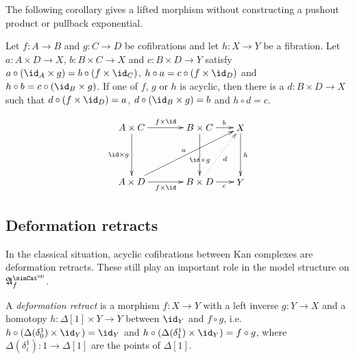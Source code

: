 \documentclass{tac}
\newcommand\hide[1]{}
\newcommand\dual{^{\mathrm{op}}}
\newcommand\s{^{\simCat\dual}}
\newcommand\of{:}
\newcommand\simplex\Delta
\newcommand\f{_f}
\newcommand\ambient{\mathfrak A}
\begin{document}
The following corollary gives a lifted morphism without constructing a pushout product or pullback exponential.

\begin{corollary} Let $f\of A\to B$ and $g\of C\to D$ be cofibrations and let $h\of X\to Y$ be a fibration. Let $a\of A\times D\to X$, $b\of B\times C\to X$ and $c\of B \times D\to Y$ satisfy $a\circ(\id_A\times g) = b\circ(f\times \id_C)$, $h\circ a=c\circ(f\times \id_D)$ and $h\circ b=c\circ(\id_B\times g)$. If one of $f$, $g$ or $h$ is acyclic, then there is a $d\of B\times D\to X$ such that $d\circ(f\times\id_D)=a$, $d\circ(\id_B\times g)=b$ and $h\circ d = c$.
\hide{\[\xymatrix{
A\times C\ar[r]^{f\times \id}\ar[d]_{\id\times g} & B\times C\ar[r]^b\ar[d]_(.3){\id\times g} & X\ar[d]^h\\
A\times D\ar[r]_{f\times \id} \ar[urr]^(.3){a} & B\times D \ar[r]_c \ar@{.>}[ur]_{d} & Y
}\]}
\[\xy
(0,20)*+{A\times C}="AC",(25,20)*+{B\times C}="BC",(40,20)*+{X}="X",
(0,0)*+{A\times D}="AD",(25,0)*+{B\times D}="BD",(40,0)*+{Y}="Y"
\ar^{f\times\id} "AC";"BC"
\ar_{\id\times g} "AC";"AD"
\ar_{f\times\id} "AD";"BD"
\ar^{a} "AD";"X"
\ar|(.6){\id\times g} "BC";"BD"
\ar^(.6){b} "BC";"X"
\ar@{.>}_{d} "BD";"X"
\ar_(.6){c} "BD";"Y"
\ar^{h} "X";"Y"
\endxy\]

\hide{Transposed view:
\[\xymatrix{
A\ar[r]^{a^t}\ar[d]_f & X^D\ar[r]^{X^g}\ar[d]^(.7){h^D} & X^C\ar[d]^{h^C}\\
B\ar[r]_{c^t} \ar[urr]_(.7){b^t} \ar@{.>}[ur]^{d^t} & Y^D \ar[r]_{Y^g} & Y^C
}\]}\label{triple lift}
\end{corollary}


\subsection{Deformation retracts}
In the classical situation, acyclic cofibrations between Kan complexes are deformation retracts. These still play an important role in the model structure on $\ambient\s\f$.

\begin{definition} A \emph{deformation retract} is a morphism $f\of X\to Y$ with a left inverse $g\of Y\to X$ and a homotopy $h\of \simplex[1]\times Y\to Y$ between $\id_Y$ and $f\circ g$, i.e.\ $h\circ (\Delta(\delta^1_0)\times \id_Y) = \id_Y$ and $h\circ (\Delta(\delta^1_1)\times \id_Y) = f\circ g$, where $\Delta(\delta^1_i)\of 1\to \simplex[1]$ are the points of $\simplex[1]$.
\end{definition}
\end{document}
